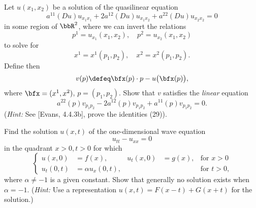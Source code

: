 \begin{problem}
  Let \(u(x_1,x_2)\) be a solution of the quasilinear equation
  \[
    a^{11}(Du)u_{x_1x_1}+ 2a^{12}(Du)u_{x_1x_2}+a^{22}(Du)u_{x_2x_2}=0
  \]
  in some region of \(\bbR^2\), where we can invert the relations
  \[
    p^1=u_{x_1}(x_1,x_2),\quad p^2=u_{x_2}(x_1,x_2)
  \]
  to solve for
  \[
    x^1=x^1(p_1,p_2),\quad x^2=x^2(p_1,p_2).
  \]
  Define then
  \[
    v(p)\defeq \bfx(p)\cdot p-u\bigl(\bfx(p)\bigr),
  \]
  where \(\bfx=(x^1,x^2)\), \(p=(p_1,p_2)\). Show that \(v\) satisfies the
  \emph{linear} equation
  \[
    a^{22}(p)v_{p_1p_2}-2a^{12}(p)v_{p_1p_2}+a^{11}(p)v_{p_1p_2}=0.
  \]
  (\emph{Hint:} See [Evans, 4.4.3b], prove the identities (29)).
\end{problem}
\begin{solution}
\end{solution}
\newpage

\begin{problem}
  Find the solution \(u(x,t)\) of the one-dimensional wave equation
  \[
    u_{tt}-u_{xx}=0
  \]
  in the quadrant \(x>0,t>0\) for which
  \[
    \left\{
      \begin{aligned}
        u(x,0)&=f(x),&u_t(x,0)&=g(x),&\text{for \(x>0\)}\\
        u_t(0,t)&=\alpha u_x(0,t),&&&\text{for \(t>0\),}
      \end{aligned}
    \right.
  \]
  where \(\alpha\neq -1\) is a given constant. Show that generally no
  solution exists when \(\alpha=-1\). (\emph{Hint:} Use a representation
  \(u(x,t)=F(x-t)+G(x+t)\) for the solution.)
\end{problem}
\begin{solution}
\end{solution}
\newpage

